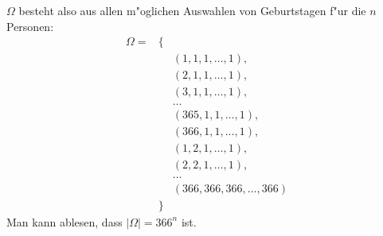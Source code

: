 $\Omega$ besteht also aus allen m"oglichen Auswahlen von Geburtstagen
f"ur die $n$ Personen:
\begin{eqnarray*}
\Omega=&\{&\\
&&(1,1,1,\dots,1),\\
&&(2,1,1,\dots,1),\\
&&(3,1,1,\dots,1),\\
&&\dots\\
&&(365,1,1,\dots,1),\\
&&(366,1,1,\dots,1),\\
&&(1,2,1,\dots,1),\\
&&(2,2,1,\dots,1),\\
&&\dots\\
&&(366,366,366,\dots,366)\\
&\}&
\end{eqnarray*}
Man kann ablesen, dass $|\Omega|=366^n$ ist.


